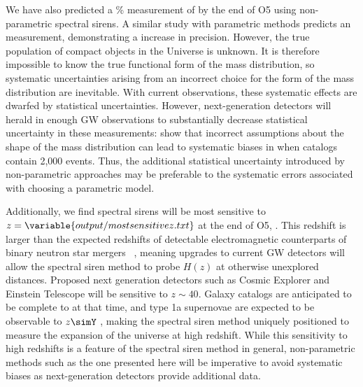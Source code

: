 \documentclass[]{aastex631}
\begin{document}
We have also predicted a \% measurement of \Ho{} by the end of \ac{O5} using non-parametric spectral sirens.
A similar study with parametric methods \citep{Chen:2024gdn} predicts an  measurement, demonstrating a  increase in precision.
However, the true population of compact objects in the Universe is unknown.
It is therefore impossible to know the true functional form of the mass distribution, so systematic uncertainties arising from an incorrect choice for the form of the mass distribution are inevitable.
With current observations, these systematic effects are dwarfed by statistical uncertainties.
However, next-generation detectors will herald in enough \ac{GW} observations to substantially decrease statistical uncertainty in these measurements: \citet{pierra_study_2023} show that incorrect assumptions about the shape of the mass distribution can lead to  systematic biases in \Ho when catalogs contain 2,000 events.
Thus, the additional statistical uncertainty introduced by non-parametric approaches may be preferable to the systematic errors associated with choosing a parametric model.

Additionally, we find spectral sirens will be most sensitive to $z=\variable{output/mostsensitivez.txt}$ at the end of \acf{O5}, .
This redshift is larger than the expected redshifts of detectable electromagnetic counterparts of binary neutron star mergers ~\citep{kiendrebogo_observing_2023}, meaning upgrades to current \ac{GW} detectors will allow the spectral siren method to probe $H(z)$ at otherwise unexplored distances.
Proposed next generation detectors such as Cosmic Explorer and Einstein Telescope will be sensitive to $z\sim40$.
Galaxy catalogs are anticipated to be complete to  at that time, and type 1a supernovae are expected to be observable to $z\simY$ , making the spectral siren method uniquely positioned to measure the expansion of the universe at high redshift.
While this sensitivity to high redshifts is a feature of the spectral siren method in general, non-parametric methods such as the one presented here will be imperative to avoid systematic biases as next-generation detectors provide additional data. 
\end{document}
